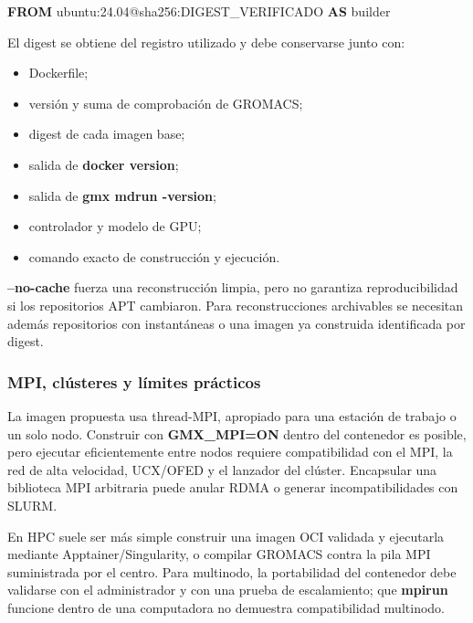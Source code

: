 \documentclass[
  spanish,
  11pt,
  a4paper]{article}
\newenvironment{Shaded}{\begin{snugshade}}{\end{snugshade}}
\newcommand{\KeywordTok}[1]{\textcolor[rgb]{0.13,0.29,0.53}{\textbf{#1}}}
\newcommand{\NormalTok}[1]{#1}
\providecommand{\tightlist}{%
  \setlength{\itemsep}{0pt}\setlength{\parskip}{0pt}}
\begin{document}
\begin{Shaded}
\begin{Highlighting}[]
\KeywordTok{FROM}\NormalTok{ ubuntu:24.04@sha256:DIGEST\_VERIFICADO }\KeywordTok{AS}\NormalTok{ builder}
\end{Highlighting}
\end{Shaded}

El digest se obtiene del registro utilizado y debe conservarse junto
con:

\begin{itemize}
\tightlist
\item
  Dockerfile;
\item
  versión y suma de comprobación de GROMACS;
\item
  digest de cada imagen base;
\item
  salida de \textbf{docker version};
\item
  salida de \textbf{gmx mdrun -version};
\item
  controlador y modelo de GPU;
\item
  comando exacto de construcción y ejecución.
\end{itemize}

\textbf{--no-cache} fuerza una reconstrucción limpia, pero no garantiza
reproducibilidad si los repositorios APT cambiaron. Para
reconstrucciones archivables se necesitan además repositorios con
instantáneas o una imagen ya construida identificada por digest.

\subsubsection{MPI, clústeres y límites
prácticos}\label{mpi-cluxfasteres-y-luxedmites-pruxe1cticos}

La imagen propuesta usa thread-MPI, apropiado para una estación de
trabajo o un solo nodo. Construir con \textbf{GMX\_MPI=ON} dentro del
contenedor es posible, pero ejecutar eficientemente entre nodos requiere
compatibilidad con el MPI, la red de alta velocidad, UCX/OFED y el
lanzador del clúster. Encapsular una biblioteca MPI arbitraria puede
anular RDMA o generar incompatibilidades con SLURM.

En HPC suele ser más simple construir una imagen OCI validada y
ejecutarla mediante Apptainer/Singularity, o compilar GROMACS contra la
pila MPI suministrada por el centro. Para multinodo, la portabilidad del
contenedor debe validarse con el administrador y con una prueba de
escalamiento; que \textbf{mpirun} funcione dentro de una computadora no
demuestra compatibilidad multinodo.
\end{document}
